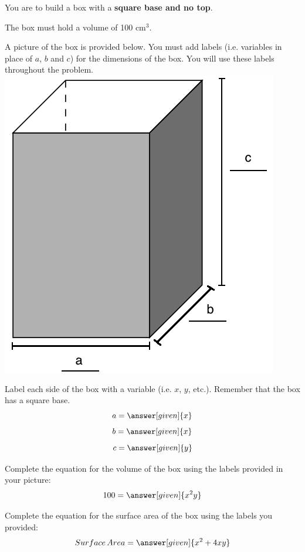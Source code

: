 \documentclass[handout]{ximera}
\begin{document}
\begin{problem}
You are to build a box with a \textbf{square base and no top}. 

The box must hold a volume of 100 cm$^3$. 

A picture of the box is provided below. You must add labels (i.e. variables in place of $a$, $b$ and $c$) for the dimensions of the box. You will use these labels throughout the problem.
\includegraphics[scale=0.25]{Boxlabels.png} 

\begin{question}
Label each side of the box with a variable (i.e. $x$, $y$, etc.). Remember that the box has a square base.
    \[
	\displaystyle  a =    \answer[given]{x}
	\]
    \[
	\displaystyle  b =    \answer[given]{x}
	\]
    \[
	\displaystyle  c =    \answer[given]{y}
	\]
\end{question}

\begin{question}
Complete the equation for the volume of the box using the labels provided in your picture:
	\[
	\displaystyle  100 =    \answer[given]{x^{2}y}
	\] 
\end{question}

\begin{question}
Complete the equation for the surface area of the box using the labels you provided: 
    \[
	 \displaystyle Surface \, Area =  \answer[given]{x^{2}+4xy}
    \]
\end{question}


\end{problem}
\end{document}

